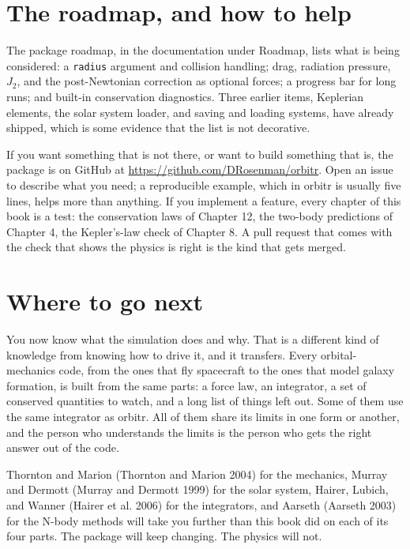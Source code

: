 \documentclass[
  10.5pt,
  letterpaper,
]{scrbook}
\theoremstyle{definition}
\theoremstyle{plain}
\theoremstyle{remark}
\begin{document}
\section{The roadmap, and how to
help}\label{the-roadmap-and-how-to-help}

The package roadmap, in the documentation under Roadmap, lists what is
being considered: a \texttt{radius} argument and collision handling;
drag, radiation pressure, \(J_2\), and the post-Newtonian correction as
optional forces; a progress bar for long runs; and built-in conservation
diagnostics. Three earlier items, Keplerian elements, the solar system
loader, and saving and loading systems, have already shipped, which is
some evidence that the list is not decorative.

If you want something that is not there, or want to build something that
is, the package is on GitHub at
\url{https://github.com/DRosenman/orbitr}. Open an issue to describe
what you need; a reproducible example, which in orbitr is usually five
lines, helps more than anything. If you implement a feature, every
chapter of this book is a test: the conservation laws of Chapter 12, the
two-body predictions of Chapter 4, the Kepler's-law check of Chapter 8.
A pull request that comes with the check that shows the physics is right
is the kind that gets merged.

\section{Where to go next}\label{where-to-go-next}

You now know what the simulation does and why. That is a different kind
of knowledge from knowing how to drive it, and it transfers. Every
orbital-mechanics code, from the ones that fly spacecraft to the ones
that model galaxy formation, is built from the same parts: a force law,
an integrator, a set of conserved quantities to watch, and a long list
of things left out. Some of them use the same integrator as orbitr. All
of them share its limits in one form or another, and the person who
understands the limits is the person who gets the right answer out of
the code.

Thornton and Marion (Thornton and Marion 2004) for the mechanics, Murray
and Dermott (Murray and Dermott 1999) for the solar system, Hairer,
Lubich, and Wanner (Hairer et al. 2006) for the integrators, and Aarseth
(Aarseth 2003) for the N-body methods will take you further than this
book did on each of its four parts. The package will keep changing. The
physics will not.
\end{document}
